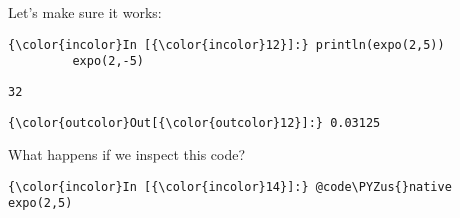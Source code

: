 \documentclass[11pt]{article}
\def\PYZus{\char`\_}
\begin{document}
    Let's make sure it works:

    \begin{Verbatim}[commandchars=\\\{\}]
{\color{incolor}In [{\color{incolor}12}]:} println(expo(2,5))
         expo(2,-5)
\end{Verbatim}

    \begin{Verbatim}[commandchars=\\\{\}]
32

    \end{Verbatim}

            \begin{Verbatim}[commandchars=\\\{\}]
{\color{outcolor}Out[{\color{outcolor}12}]:} 0.03125
\end{Verbatim}
        
    What happens if we inspect this code?

    \begin{Verbatim}[commandchars=\\\{\}]
{\color{incolor}In [{\color{incolor}14}]:} @code\PYZus{}native expo(2,5)
\end{Verbatim}
\end{document}
